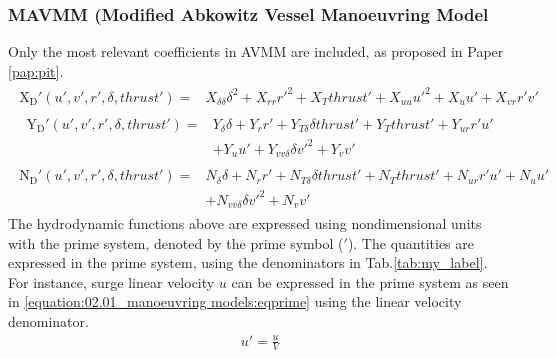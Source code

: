 \subsubsection*{MAVMM (Modified Abkowitz Vessel Manoeuvring Model}
Only the most relevant coefficients in AVMM are included, as proposed in Paper \ref{pap:pit}.
\begin{equation}\label{equation:02.01_manoeuvring models:eqxmartinssimple}
\begin{split}\begin{split}
\operatorname{X_{D}'}{\left(u',v',r',\delta,thrust' \right)} = & X_{\delta\delta} \delta^{2} + X_{rr} r'^{2} + X_{T} thrust' + X_{uu} u'^{2} + X_{u} u' + X_{vr} r' v' 
\end{split}\end{split}
\end{equation}\begin{equation}\label{equation:02.01_manoeuvring models:eqymartinssimple}
\begin{split}\begin{split}
\operatorname{Y_{D}'}{\left(u',v',r',\delta,thrust' \right)} = & Y_{\delta} \delta + Y_{r} r' + Y_{T\delta} \delta thrust' + Y_{T} thrust' + Y_{ur} r' u' \\ & + Y_{u} u' + Y_{vv\delta} \delta v'^{2} + Y_{v} v' 
\end{split}\end{split}
\end{equation}\begin{equation}\label{equation:02.01_manoeuvring models:eqnmartinssimple}
\begin{split}\begin{split}
\operatorname{N_{D}'}{\left(u',v',r',\delta,thrust' \right)} = & N_{\delta} \delta + N_{r} r' + N_{T\delta} \delta thrust' + N_{T} thrust' + N_{ur} r' u' + N_{u} u' \\ & + N_{vv\delta} \delta v'^{2} + N_{v} v' 
\end{split}\end{split}
\end{equation}
\sphinxAtStartPar
The hydrodynamic functions above are expressed using nondimensional units with the prime system, denoted by the prime symbol (\('\)). The quantities are expressed in the prime system, using the denominators in Tab.\ref{tab:my_label}. For instance, surge linear velocity \(u\) can be expressed in the prime system as seen in \autoref{equation:02.01_manoeuvring models:eqprime} using the linear velocity denominator.
\begin{equation}\label{equation:02.01_manoeuvring models:eqprime}
\begin{split}\displaystyle u'=\frac{u}{V}\end{split}
\end{equation}
